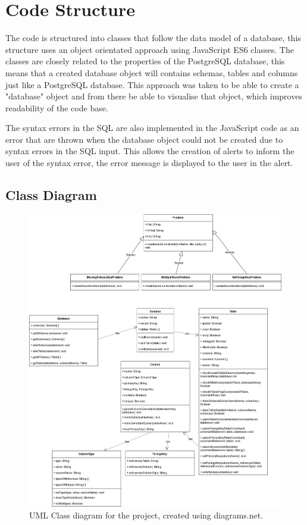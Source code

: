 \section{Code Structure}

The code is structured into classes that follow the data model of a database, this structure uses an object orientated approach using JavaScript ES6 classes. The classes are closely related to the properties of the PostgreSQL database, this means that a created database object will contains schemas, tables and columns just like a PostgreSQL database. This approach was taken to be able to create a "database" object and from there be able to visualise that object, which improves readability of the code base. 

The syntax errors in the SQL are also implemented in the JavaScript code as an error that are thrown when the database object could not be created due to syntax errors in the SQL input. This allows the creation of alerts to inform the user of the syntax error, the error message is displayed to the user in the alert.

\newpage

\subsection{Class Diagram}

\begin{figure}[h!]
	\centering
	\includegraphics[width=\textwidth]{classDiagram}
	\caption{UML Class diagram for the project, created using diagrams.net\cite{dbdiagram}.}
	\label{fig:classDiagram}
\end{figure}

